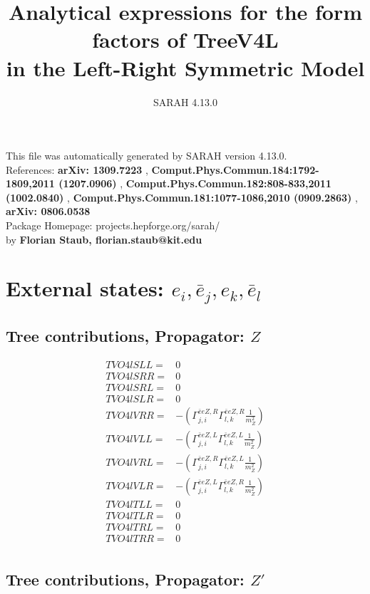 \documentclass[A4,landscape]{article}
\begin{document}
\title{Analytical expressions for the form factors of TreeV4L\\ in the Left-Right Symmetric Model } 
 \author{SARAH 4.13.0} 
 \maketitle 
 \vspace{10cm} 
This file was automatically generated by SARAH version 4.13.0.  \\ 
References: {\bf arXiv: 1309.7223 }, {\bf Comput.Phys.Commun.184:1792-1809,2011 (1207.0906) }, {\bf Comput.Phys.Commun.182:808-833,2011 (1002.0840) }, {\bf Comput.Phys.Commun.181:1077-1086,2010 (0909.2863) }, {\bf arXiv: 0806.0538 } \\ 
Package Homepage: projects.hepforge.org/sarah/ \\ 
by {\bf Florian Staub, florian.staub@kit.edu} 
 \pagebreak 
 \tableofcontents 
 \pagebreak 
\section{External states: ${e_{{i}}, \bar{e}_{{j}}, e_{{k}}, \bar{e}_{{l}}}$} 
\subsection{Tree contributions, Propagator: $Z$} 

\begin{align} 
  TVO4lSLL= & 0 \\ 
  TVO4lSRR= & 0 \\ 
  TVO4lSRL= & 0 \\ 
  TVO4lSLR= & 0 \\ 
  TVO4lVRR= & -(\Gamma^{\bar{e}e Z ,R}_{j, i} \Gamma^{\bar{e}e Z ,R}_{l, k} \frac{1}{m^2_{Z}}) \\ 
  TVO4lVLL= & -(\Gamma^{\bar{e}e Z ,L}_{j, i} \Gamma^{\bar{e}e Z ,L}_{l, k} \frac{1}{m^2_{Z}}) \\ 
  TVO4lVRL= & -(\Gamma^{\bar{e}e Z ,R}_{j, i} \Gamma^{\bar{e}e Z ,L}_{l, k} \frac{1}{m^2_{Z}}) \\ 
  TVO4lVLR= & -(\Gamma^{\bar{e}e Z ,L}_{j, i} \Gamma^{\bar{e}e Z ,R}_{l, k} \frac{1}{m^2_{Z}}) \\ 
  TVO4lTLL= & 0 \\ 
  TVO4lTLR= & 0 \\ 
  TVO4lTRL= & 0 \\ 
  TVO4lTRR= & 0 \\ 
\end{align} 
\subsection{Tree contributions, Propagator: ${Z'}$} 
\end{document}

